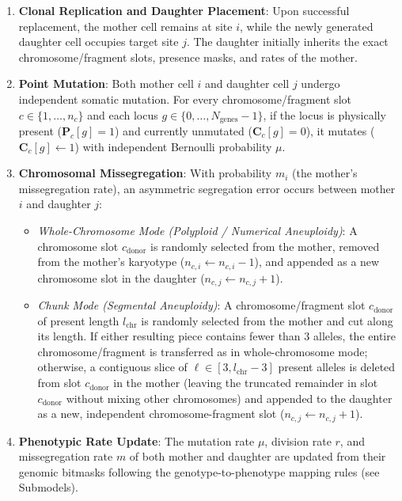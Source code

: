 \documentclass[11pt,a4paper]{article}
\begin{document}
\begin{enumerate}
    \item \textbf{Clonal Replication and Daughter Placement}:
    Upon successful replacement, the mother cell remains at site $i$, while the newly generated daughter cell occupies target site $j$. The daughter initially inherits the exact chromosome/fragment slots, presence masks, and rates of the mother.
    
    \item \textbf{Point Mutation}:
    Both mother cell $i$ and daughter cell $j$ undergo independent somatic mutation. For every chromosome/fragment slot $c \in \{1, \dots, n_{c}\}$ and each locus $g \in \{0, \dots, N_{\text{genes}}-1\}$, if the locus is physically present ($\mathbf{P}_{c}[g] = 1$) and currently unmutated ($\mathbf{C}_{c}[g] = 0$), it mutates ($\mathbf{C}_{c}[g] \leftarrow 1$) with independent Bernoulli probability $\mu$.
    
    \item \textbf{Chromosomal Missegregation}:
    With probability $m_i$ (the mother's missegregation rate), an asymmetric segregation error occurs between mother $i$ and daughter $j$:
    \begin{itemize}
        \item \textit{Whole-Chromosome Mode (Polyploid / Numerical Aneuploidy)}: A chromosome slot $c_{\text{donor}}$ is randomly selected from the mother, removed from the mother's karyotype ($n_{c, i} \leftarrow n_{c, i} - 1$), and appended as a new chromosome slot in the daughter ($n_{c, j} \leftarrow n_{c, j} + 1$).
        \item \textit{Chunk Mode (Segmental Aneuploidy)}: A chromosome/fragment slot $c_{\text{donor}}$ of present length $l_{\text{chr}}$ is randomly selected from the mother and cut along its length. If either resulting piece contains fewer than $3$ alleles, the entire chromosome/fragment is transferred as in whole-chromosome mode; otherwise, a contiguous slice of $\ell \in [3, l_{\text{chr}}-3]$ present alleles is deleted from slot $c_{\text{donor}}$ in the mother (leaving the truncated remainder in slot $c_{\text{donor}}$ without mixing other chromosomes) and appended to the daughter as a new, independent chromosome-fragment slot ($n_{c, j} \leftarrow n_{c, j} + 1$).
    \end{itemize}
    
    \item \textbf{Phenotypic Rate Update}:
    The mutation rate $\mu$, division rate $r$, and missegregation rate $m$ of both mother and daughter are updated from their genomic bitmasks following the genotype-to-phenotype mapping rules (see Submodels).
    

\end{enumerate}
\end{document}
